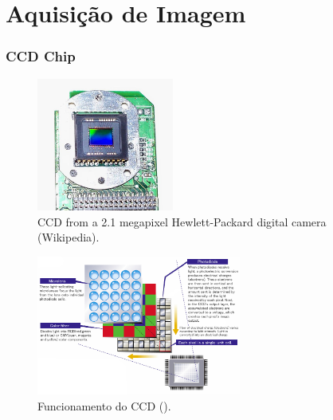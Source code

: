 \section{Aquisição de Imagem}

\begin{frame}[allowframebreaks]
  \frametitle{CCD Chip}
  \begin{figure}[h!]
  \centering
  \includegraphics[width=0.4\textwidth]{images/ccd_chip.jpg}
  \caption{CCD from a 2.1 megapixel Hewlett-Packard digital camera (Wikipedia).}
  \label{fig:ccd_chip}
  \end{figure}

  \framebreak

   \begin{figure}[h!]
  \centering
  \includegraphics[width=0.6\textwidth]{images/ccd-panasonic.jpg}
  \caption{Funcionamento do CCD ().} 
  \label{fig:ccd-panasonic}
  \end{figure}

  \framebreak


\end{frame}
